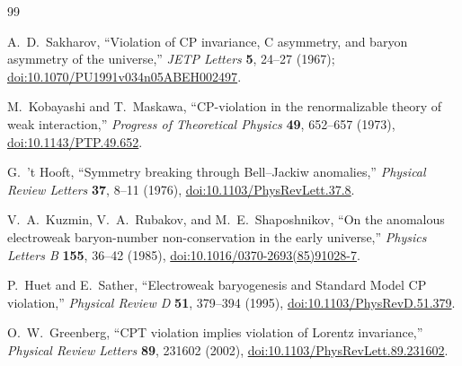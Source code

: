 \documentclass[11pt]{article}
\theoremstyle{definition}
\theoremstyle{remark}
\begin{document}
\begin{thebibliography}{99}

A.~D.~Sakharov,
``Violation of CP invariance, C asymmetry, and baryon asymmetry of the
universe,''
\emph{JETP Letters} \textbf{5}, 24--27 (1967);
\href{https://doi.org/10.1070/PU1991v034n05ABEH002497}
{doi:10.1070/PU1991v034n05ABEH002497}.

M.~Kobayashi and T.~Maskawa,
``CP-violation in the renormalizable theory of weak interaction,''
\emph{Progress of Theoretical Physics} \textbf{49}, 652--657 (1973),
\href{https://doi.org/10.1143/PTP.49.652}
{doi:10.1143/PTP.49.652}.

G.~'t Hooft,
``Symmetry breaking through Bell--Jackiw anomalies,''
\emph{Physical Review Letters} \textbf{37}, 8--11 (1976),
\href{https://doi.org/10.1103/PhysRevLett.37.8}
{doi:10.1103/PhysRevLett.37.8}.

V.~A.~Kuzmin, V.~A.~Rubakov, and M.~E.~Shaposhnikov,
``On the anomalous electroweak baryon-number non-conservation in the early
universe,''
\emph{Physics Letters B} \textbf{155}, 36--42 (1985),
\href{https://doi.org/10.1016/0370-2693(85)91028-7}
{doi:10.1016/0370-2693(85)91028-7}.

P.~Huet and E.~Sather,
``Electroweak baryogenesis and Standard Model CP violation,''
\emph{Physical Review D} \textbf{51}, 379--394 (1995),
\href{https://doi.org/10.1103/PhysRevD.51.379}
{doi:10.1103/PhysRevD.51.379}.

O.~W.~Greenberg,
``CPT violation implies violation of Lorentz invariance,''
\emph{Physical Review Letters} \textbf{89}, 231602 (2002),
\href{https://doi.org/10.1103/PhysRevLett.89.231602}
{doi:10.1103/PhysRevLett.89.231602}.

\end{thebibliography}
\end{document}
